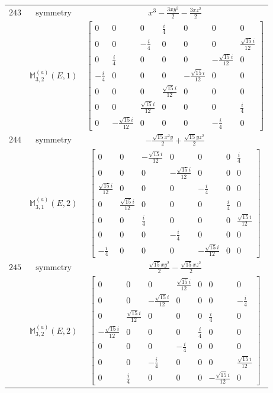 \documentclass[fleqn,8pt,landscape]{jsarticle}
\begin{document}
\begin{longtable}{ccc}
$ 243 $ & $ \text{symmetry} $ & $ x^{3} - \frac{3 x y^{2}}{2} - \frac{3 x z^{2}}{2} $ \\
$  $ & $ \mathbb{M}_{3,2}^{(a)}(E,1) $ & $ \begin{bmatrix} 0 & 0 & 0 & \frac{i}{4} & 0 & 0 & 0 \\ 0 & 0 & - \frac{i}{4} & 0 & 0 & 0 & \frac{\sqrt{15} i}{12} \\ 0 & \frac{i}{4} & 0 & 0 & 0 & - \frac{\sqrt{15} i}{12} & 0 \\ - \frac{i}{4} & 0 & 0 & 0 & - \frac{\sqrt{15} i}{12} & 0 & 0 \\ 0 & 0 & 0 & \frac{\sqrt{15} i}{12} & 0 & 0 & 0 \\ 0 & 0 & \frac{\sqrt{15} i}{12} & 0 & 0 & 0 & \frac{i}{4} \\ 0 & - \frac{\sqrt{15} i}{12} & 0 & 0 & 0 & - \frac{i}{4} & 0 \end{bmatrix} $ \\ \hline
$ 244 $ & $ \text{symmetry} $ & $ - \frac{\sqrt{15} x^{2} y}{2} + \frac{\sqrt{15} y z^{2}}{2} $ \\
$  $ & $ \mathbb{M}_{3,1}^{(a)}(E,2) $ & $ \begin{bmatrix} 0 & 0 & - \frac{\sqrt{15} i}{12} & 0 & 0 & 0 & \frac{i}{4} \\ 0 & 0 & 0 & - \frac{\sqrt{15} i}{12} & 0 & 0 & 0 \\ \frac{\sqrt{15} i}{12} & 0 & 0 & 0 & - \frac{i}{4} & 0 & 0 \\ 0 & \frac{\sqrt{15} i}{12} & 0 & 0 & 0 & \frac{i}{4} & 0 \\ 0 & 0 & \frac{i}{4} & 0 & 0 & 0 & \frac{\sqrt{15} i}{12} \\ 0 & 0 & 0 & - \frac{i}{4} & 0 & 0 & 0 \\ - \frac{i}{4} & 0 & 0 & 0 & - \frac{\sqrt{15} i}{12} & 0 & 0 \end{bmatrix} $ \\ \hline
$ 245 $ & $ \text{symmetry} $ & $ \frac{\sqrt{15} x y^{2}}{2} - \frac{\sqrt{15} x z^{2}}{2} $ \\
$  $ & $ \mathbb{M}_{3,2}^{(a)}(E,2) $ & $ \begin{bmatrix} 0 & 0 & 0 & \frac{\sqrt{15} i}{12} & 0 & 0 & 0 \\ 0 & 0 & - \frac{\sqrt{15} i}{12} & 0 & 0 & 0 & - \frac{i}{4} \\ 0 & \frac{\sqrt{15} i}{12} & 0 & 0 & 0 & \frac{i}{4} & 0 \\ - \frac{\sqrt{15} i}{12} & 0 & 0 & 0 & \frac{i}{4} & 0 & 0 \\ 0 & 0 & 0 & - \frac{i}{4} & 0 & 0 & 0 \\ 0 & 0 & - \frac{i}{4} & 0 & 0 & 0 & \frac{\sqrt{15} i}{12} \\ 0 & \frac{i}{4} & 0 & 0 & 0 & - \frac{\sqrt{15} i}{12} & 0 \end{bmatrix} $ \\ \hline

\end{longtable}
\end{document}
